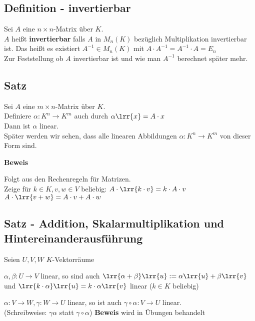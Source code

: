 \subsection{Definition - invertierbar}
	Sei $A$ eine $n\times n$-Matrix über $K$.\\
	$A$ heißt \textbf{invertierbar} falls $A$ in $M_n(K)$ bezüglich Multiplikation invertierbar ist. Das heißt es existiert $A^{-1}\in M_n(K)$ mit $A\cdot A^{-1}=A^{-1}\cdot A=E_n$ \\
	Zur Feststellung ob $A$ invertierbar ist und wie man $A^{-1}$ berechnet später mehr.

\subsection{Satz}
	Sei $A$ eine $m\times n$-Matrix über $K$.\\
	Definiere $\alpha:K^n\rightarrow K^m$ auch durch $\alpha\lrr{x}=A\cdot x$\\
	Dann ist $\alpha$ linear.\\
	Später werden wir sehen, dass alle linearen Abbildungen $\alpha:K^n\rightarrow K^m$ von dieser Form sind.

	\textbf{Beweis}

	Folgt aus den Rechenregeln für Matrizen.\\
	Zeige für $k\in K, v,w\in V$ beliebig: $A\cdot\lrr{k\cdot v}=k\cdot A\cdot v$\\
	$A\cdot\lrr{v+w}=A\cdot v+A\cdot w$

\subsection{Satz - Addition, Skalarmultiplikation und Hintereinanderausführung}
	Seien $U,V,W$ $K$-Vektorräume
		\item $\alpha,\beta:U\rightarrow V$ linear, so sind auch $\lrr{\alpha+\beta}\lrr{u}:=\alpha\lrr{u}+\beta\lrr{v}$ und $\lrr{k\cdot\alpha}\lrr{u}=k\cdot\alpha\lrr{v}$ linear ($k\in K$ beliebig)
		\item $\alpha:V\rightarrow W,\gamma:W\rightarrow U$ linear, so ist auch $\gamma\circ\alpha:V\rightarrow U$ linear.\\
			(Schreibweise: $\gamma\alpha$ statt $\gamma\circ\alpha$)
	\subExEnd
	\textbf{Beweis} wird in Übungen behandelt

